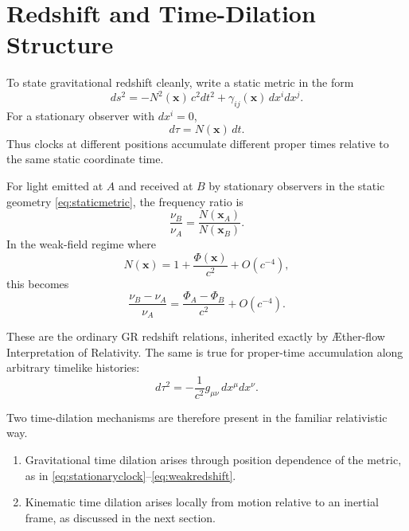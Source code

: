 \documentclass[11pt]{article}
\newcommand{\Aflow}{\AE{}ther-flow}
\newcommand{\TheoryName}{\Aflow{} Interpretation of Relativity}
\begin{document}
\section{Redshift and Time-Dilation Structure}

To state gravitational redshift cleanly, write a static metric in the form
\begin{equation}
ds^2=-N^2(\mathbf{x})\,c^2dt^2+\gamma_{ij}(\mathbf{x})\,dx^i dx^j.
\label{eq:staticmetric}
\end{equation}
For a stationary observer with \(dx^i=0\),
\begin{equation}
d\tau = N(\mathbf{x})\,dt.
\label{eq:stationaryclock}
\end{equation}
Thus clocks at different positions accumulate different proper times relative to the same static coordinate time.

For light emitted at \(A\) and received at \(B\) by stationary observers in the static geometry \eqref{eq:staticmetric}, the frequency ratio is
\begin{equation}
\frac{\nu_B}{\nu_A}
=
\frac{N(\mathbf{x}_A)}{N(\mathbf{x}_B)}.
\label{eq:redshift}
\end{equation}
In the weak-field regime where
\begin{equation}
N(\mathbf{x}) = 1+\frac{\Phi(\mathbf{x})}{c^2}+O(c^{-4}),
\label{eq:lapseweakfield}
\end{equation}
this becomes
\begin{equation}
\frac{\nu_B-\nu_A}{\nu_A}
=
\frac{\Phi_A-\Phi_B}{c^2}
+ O(c^{-4}).
\label{eq:weakredshift}
\end{equation}

These are the ordinary GR redshift relations, inherited exactly by \TheoryName{}. The same is true for proper-time accumulation along arbitrary timelike histories:
\begin{equation}
d\tau^2
=
-\frac{1}{c^2}g_{\mu\nu}\,dx^\mu dx^\nu.
\label{eq:propertime}
\end{equation}

Two time-dilation mechanisms are therefore present in the familiar relativistic way.
\begin{enumerate}
    \item Gravitational time dilation arises through position dependence of the metric, as in \eqref{eq:stationaryclock}--\eqref{eq:weakredshift}.
    \item Kinematic time dilation arises locally from motion relative to an inertial frame, as discussed in the next section.
\end{enumerate}
\end{document}
